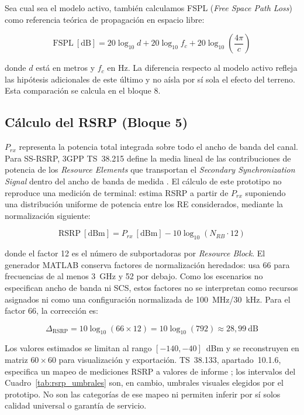Sea cual sea el modelo activo, también calculamos FSPL (\textit{Free Space Path Loss})
como referencia teórica de propagación en espacio libre:

\begin{equation}
\text{FSPL}~[\text{dB}] = 20\log_{10}d + 20\log_{10}f_c + 20\log_{10}\!\left(\frac{4\pi}{c}\right)
\label{eq:fspl}
\end{equation}

donde $d$ está en metros y $f_c$ en Hz. La diferencia respecto al modelo activo refleja
las hipótesis adicionales de este último y no aísla por sí sola el efecto del terreno.
Esta comparación se calcula en el bloque 8.

\subsection{Cálculo del RSRP (Bloque 5)}
\label{sec:matlab_rsrp}

$P_{rx}$ representa la potencia total integrada sobre todo el ancho de banda del canal.
Para SS-RSRP, 3GPP TS~38.215 define la media lineal de las contribuciones de potencia de
los \textit{Resource Elements} que transportan el \textit{Secondary Synchronization Signal}
dentro del ancho de banda de medida \cite{3gpp_ts38215_2022}. El cálculo de este prototipo
no reproduce una medición de terminal: estima RSRP a partir de $P_{rx}$ suponiendo una
distribución uniforme de potencia entre los RE considerados, mediante la normalización
siguiente:

\begin{equation}
\text{RSRP}~[\text{dBm}] = P_{rx}~[\text{dBm}] - 10\log_{10}(N_{RB} \cdot 12)
\label{eq:rsrp}
\end{equation}

donde el factor 12 es el número de subportadoras por \textit{Resource Block}. El generador
MATLAB conserva factores de normalización heredados: usa 66 para frecuencias de al menos
3~GHz y 52 por debajo. Como los escenarios no especifican ancho de banda ni SCS, estos
factores no se interpretan como recursos asignados ni como una configuración normalizada
de 100~MHz/30~kHz. Para el factor 66, la corrección es:

\begin{equation}
\Delta_{\text{RSRP}} = 10\log_{10}(66 \times 12) = 10\log_{10}(792) \approx 28{,}99~\text{dB}
\label{eq:delta_rsrp}
\end{equation}

Los valores estimados se limitan al rango $[-140, -40]$~dBm y se reconstruyen en
matriz $60 \times 60$ para visualización y exportación. TS~38.133, apartado~10.1.6, especifica
un mapeo de mediciones RSRP a valores de informe \cite{etsi_ts138133_v153400_2026}; los
intervalos del Cuadro~\ref{tab:rsrp_umbrales} son, en cambio, umbrales visuales elegidos
por el prototipo. No son las categorías de ese mapeo ni permiten inferir por sí solos
calidad universal o garantía de servicio.

